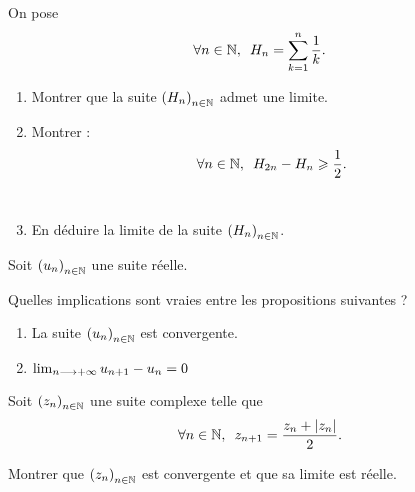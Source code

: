 \begin{corr}
\end{corr}

\begin{exo}
On pose \[\quantifs{\forall n\in\N}H_n=\sum_{k=1}^{n}\dfrac{1}{k}.\]

\begin{enumerate}
\item Montrer que la suite \(\left(H_n\right)_{n\in\mathbb{N}}\) admet une limite. \\

\item Montrer : \[\quantifs{\forall n\in\N}H_{2n}-H_n\geq\dfrac{1}{2}.\] \\

\item En déduire la limite de la suite \(\left(H_n\right)_{n\in\mathbb{N}}\).
\end{enumerate}
\end{exo}

\begin{corr}
\end{corr}

\begin{exo}[Exercice 5]
Soit \(\left(u_n\right)_{n\in\mathbb{N}}\) une suite réelle.

Quelles implications sont vraies entre les propositions suivantes ?

\begin{enumerate}
\item La suite \(\left(u_n\right)_{n\in\mathbb{N}}\) est convergente. \\

\item \(\lim_{n\longrightarrow+\infty}u_{n+1}-u_n=0\)
\end{enumerate}
\end{exo}

\begin{corr}
\end{corr}

\begin{exo}[Exercice 6]
Soit \(\left(z_n\right)_{n\in\mathbb{N}}\) une suite complexe telle que \[\quantifs{\forall n\in\N}z_{n+1}=\dfrac{z_n+\abs{z_n}}{2}.\]

Montrer que \(\left(z_n\right)_{n\in\mathbb{N}}\) est convergente et que sa limite est réelle.
\end{exo}

\begin{corr}
\end{corr}

